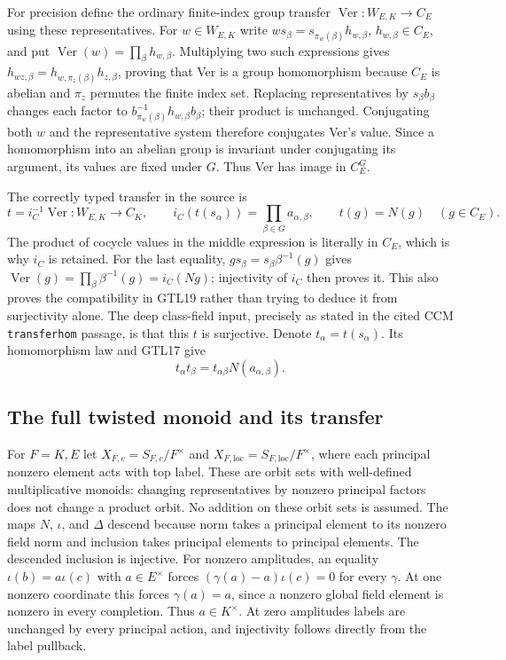For precision define the ordinary finite-index group transfer
$\operatorname{Ver}:W_{E,K}\to C_E$ using these representatives.
For $w\in W_{E,K}$ write
$w s_\beta=s_{\pi_w(\beta)}h_{w,\beta}$, $h_{w,\beta}\in C_E$,
and put $\operatorname{Ver}(w)=\prod_\beta h_{w,\beta}$.
Multiplying two such expressions gives
$h_{wz,\beta}=h_{w,\pi_z(\beta)}h_{z,\beta}$, proving that
Ver is a group homomorphism because $C_E$ is abelian and
$\pi_z$ permutes the finite index set. Replacing representatives
by $s_\beta b_\beta$ changes each factor to
$b_{\pi_w(\beta)}^{-1}h_{w,\beta}b_\beta$; their product is
unchanged. Conjugating both $w$ and the representative system
therefore conjugates Ver's value. Since a homomorphism into an
abelian group is invariant under conjugating its argument, its
values are fixed under $G$. Thus Ver has image in $C_E^G$.

The correctly typed transfer in the source is
\begin{equation}\tag{GTL19}
 t=i_C^{-1}\operatorname{Ver}:W_{E,K}\longrightarrow C_K,
 \qquad
 i_C(t(s_\alpha))=\prod_{\beta\in G}a_{\alpha,\beta},
 \qquad t(g)=N(g)\quad(g\in C_E).
\end{equation}
The product of cocycle values in the middle expression is
literally in $C_E$, which is why $i_C$ is retained. For the last
equality, $g s_\beta=s_\beta\beta^{-1}(g)$ gives
$\operatorname{Ver}(g)=\prod_\beta\beta^{-1}(g)=i_C(Ng)$;
injectivity of $i_C$ then proves it. This also proves the
compatibility in GTL19 rather than trying to deduce it from
surjectivity alone. The deep class-field input, precisely as
stated in the cited CCM \texttt{transferhom} passage, is that
this $t$ is surjective. Denote $t_\alpha=t(s_\alpha)$. Its
homomorphism law and GTL17 give
\begin{equation}\tag{GTL20}
 t_\alpha t_\beta=t_{\alpha\beta}N(a_{\alpha,\beta}).
\end{equation}

\subsection{The full twisted monoid and its transfer}

For $F=K,E$ let
$X_{F,c}=S_{F,c}/F^\times$ and
$X_{F,\mathrm{loc}}=S_{F,\mathrm{loc}}/F^\times$,
where each principal nonzero element acts with top label.
These are orbit sets with well-defined multiplicative monoids:
changing representatives by nonzero principal factors does not
change a product orbit. No addition on these orbit sets is
assumed. The maps $N$, $\iota$, and $\Delta$ descend because
norm takes a principal element to its nonzero field norm and
inclusion takes principal elements to principal elements.
The descended inclusion is injective. For nonzero amplitudes,
an equality $\iota(b)=a\iota(c)$ with $a\in E^\times$ forces
$(\gamma(a)-a)\iota(c)=0$ for every $\gamma$. At one nonzero
coordinate this forces $\gamma(a)=a$, since a nonzero global
field element is nonzero in every completion. Thus $a\in K^\times$.
At zero amplitudes labels are unchanged by every principal action,
and injectivity follows directly from the label pullback.

